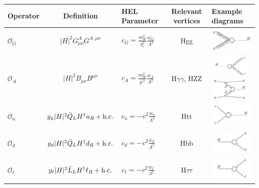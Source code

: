 \begin{tabular}{lcm{3cm}<{\centering}cm{4.5cm}<{\centering}}
    Operator & Definition & HEL Parameter & Relevant vertices & Example diagrams \\ \hline
    
    $\mathcal{O}_G$ & $|H|^2G^A_{\mu\nu}G^{A,\mu\nu}$ & $c_G=\frac{m_W^2}{g_s^2}\frac{w_G}{\Lambda^2}$ & Hgg & \vspace{.1cm}\includegraphics[width=2.5cm]{Figures/eft/eft_feynman/cG.pdf} \\
    
    $\mathcal{O}_A$ & $|H|^2B_{\mu\nu}B^{\mu\nu}$ & $c_A=\frac{m_W^2}{g^{'2}}\frac{w_A}{\Lambda^2}$ & H$\gamma\gamma$, HZZ & \vspace{.1cm}\includegraphics[width=2cm]{Figures/eft/eft_feynman/cA.pdf} \vspace{.1cm}\includegraphics[width=2cm]{Figures/eft/eft_feynman/cB.pdf} \\
    
    $\mathcal{O}_u$ & $y_u|H|^2\bar{Q}_LH^{\dagger}u_R + {\rm{h.c.}}$ & $c_u=-v^2\frac{w_u}{\Lambda^2}$ & Htt & \vspace{.1cm}\includegraphics[width=2.5cm]{Figures/eft/eft_feynman/cu.pdf} \\
    
    $\mathcal{O}_d$ & $y_d|H|^2\bar{Q}_LH^{\dagger}d_R + {\rm{h.c.}}$ & $c_d=-v^2\frac{w_d}{\Lambda^2}$ & Hbb & \vspace{.1cm}\includegraphics[width=2.5cm]{Figures/eft/eft_feynman/cd.pdf} \\
    
    $\mathcal{O}_\ell$ & $y_\ell|H|^2\bar{L}_LH^{\dagger}\ell_R + {\rm{h.c.}}$ & $c_\ell=-v^2\frac{w_\ell}{\Lambda^2}$ & H$\tau\tau$  & \vspace{.1cm}\includegraphics[width=2.5cm]{Figures/eft/eft_feynman/cl.pdf} \\
    

\end{tabular}
